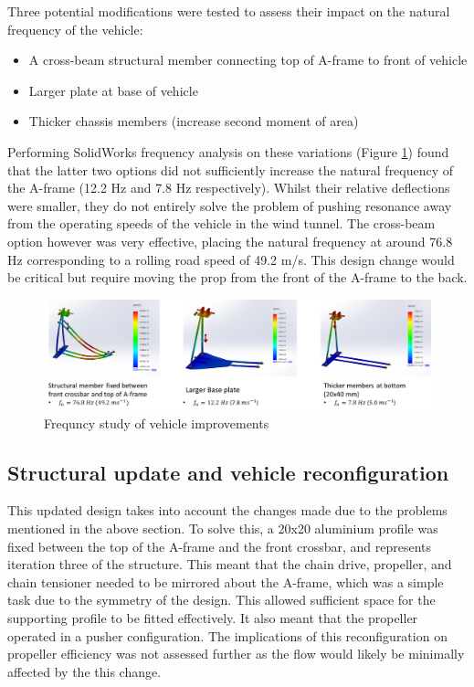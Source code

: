 Three potential modifications were tested to assess their impact on the natural frequency of the vehicle:

\begin{itemize}
  \item A cross-beam structural member connecting top of A-frame to front of vehicle
  \item Larger plate at base of vehicle
  \item Thicker chassis members (increase second moment of area)
\end{itemize}

Performing SolidWorks frequency analysis on these variations (Figure \ref{fig:freqStudy2}) found that the latter two options did not sufficiently increase the natural frequency of the A-frame (12.2 Hz and 7.8 Hz respectively). Whilst their relative deflections were smaller, they do not entirely solve the problem of pushing resonance away from the operating speeds of the vehicle in the wind tunnel. The cross-beam option however was very effective, placing the natural frequency at around 76.8 Hz corresponding to a rolling road speed of 49.2 m/s. This design change would be critical but require moving the prop from the front of the A-frame to the back.

\begin{figure}[!htbp]
    \centering
    \includegraphics{images/part8/freqStudy2.png}
    \caption{Frequncy study of vehicle improvements}
    \label{fig:freqStudy2}
\end{figure}

\subsection{Structural update and vehicle reconfiguration}

This updated design takes into account the changes made due to the problems mentioned in the above section. To solve this, a 20x20 aluminium profile was fixed between the top of the A-frame and the front crossbar, and represents iteration three of the structure. This meant that the chain drive, propeller, and chain tensioner needed to be mirrored about the A-frame, which was a simple task due to the symmetry of the design. This allowed sufficient space for the supporting profile to be fitted effectively. It also meant that the propeller operated in a pusher configuration. The implications of this reconfiguration on propeller efficiency was not assessed further as the flow would likely be minimally affected by the this change.

